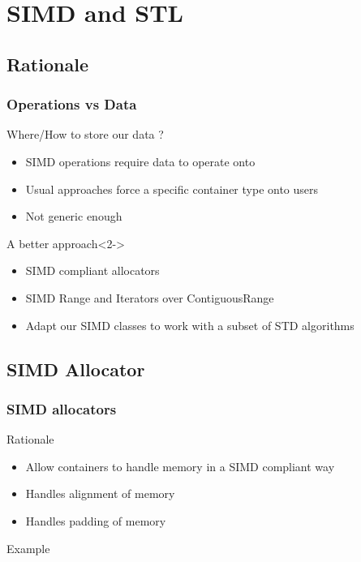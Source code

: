 \section{SIMD and STL}
\subsection{Rationale}
\frame
{
  \frametitle{Operations vs Data}
  \begin{block}{Where/How to store our data ?}
  \begin{itemize}
  \item SIMD operations require data to operate onto
  \item Usual approaches force a specific container type onto users
  \item Not generic enough
  \end{itemize}
  \end{block}{}

  \begin{block}{A better approach}<2->
  \begin{itemize}
  \item SIMD compliant allocators
  \item SIMD Range and Iterators over ContiguousRange
  \item Adapt our SIMD classes to work with a subset of STD algorithms
  \end{itemize}
  \end{block}{}
}


\subsection{SIMD Allocator}
\frame
{
  \frametitle{SIMD allocators}
  \begin{block}{Rationale}
  \begin{itemize}
  \item Allow containers to handle memory in a SIMD compliant way
  \item Handles alignment of memory
  \item Handles padding of memory
  \end{itemize}
  \end{block}{}

  \begin{block}{Example}
  \begin{center}
  \lstallocator
  \end{center}
  \end{block}{}
}

